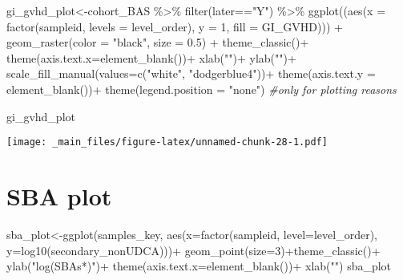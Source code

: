 \documentclass[
]{book}
\newenvironment{Shaded}{\begin{snugshade}}{\end{snugshade}}
\newcommand{\AttributeTok}[1]{\textcolor[rgb]{0.77,0.63,0.00}{#1}}
\newcommand{\CommentTok}[1]{\textcolor[rgb]{0.56,0.35,0.01}{\textit{#1}}}
\newcommand{\DecValTok}[1]{\textcolor[rgb]{0.00,0.00,0.81}{#1}}
\newcommand{\FloatTok}[1]{\textcolor[rgb]{0.00,0.00,0.81}{#1}}
\newcommand{\FunctionTok}[1]{\textcolor[rgb]{0.00,0.00,0.00}{#1}}
\newcommand{\NormalTok}[1]{#1}
\newcommand{\OtherTok}[1]{\textcolor[rgb]{0.56,0.35,0.01}{#1}}
\newcommand{\SpecialCharTok}[1]{\textcolor[rgb]{0.00,0.00,0.00}{#1}}
\newcommand{\StringTok}[1]{\textcolor[rgb]{0.31,0.60,0.02}{#1}}
\begin{document}
\begin{Shaded}
\begin{Highlighting}[]
\NormalTok{gi\_gvhd\_plot}\OtherTok{\textless{}{-}}\NormalTok{cohort\_BAS }\SpecialCharTok{\%\textgreater{}\%} 
  \FunctionTok{filter}\NormalTok{(later}\SpecialCharTok{==}\StringTok{"Y"}\NormalTok{) }\SpecialCharTok{\%\textgreater{}\%} 
  \FunctionTok{ggplot}\NormalTok{((}\FunctionTok{aes}\NormalTok{(}\AttributeTok{x =} \FunctionTok{factor}\NormalTok{(sampleid, }\AttributeTok{levels =}\NormalTok{ level\_order), }\AttributeTok{y =} \DecValTok{1}\NormalTok{, }\AttributeTok{fill =}\NormalTok{ GI\_GVHD))) }\SpecialCharTok{+} 
  \FunctionTok{geom\_raster}\NormalTok{(}\AttributeTok{color =} \StringTok{"black"}\NormalTok{, }\AttributeTok{size =} \FloatTok{0.5}\NormalTok{) }\SpecialCharTok{+}
  \FunctionTok{theme\_classic}\NormalTok{()}\SpecialCharTok{+} \FunctionTok{theme}\NormalTok{(}\AttributeTok{axis.text.x=}\FunctionTok{element\_blank}\NormalTok{())}\SpecialCharTok{+}
  \FunctionTok{xlab}\NormalTok{(}\StringTok{""}\NormalTok{)}\SpecialCharTok{+}
  \FunctionTok{ylab}\NormalTok{(}\StringTok{""}\NormalTok{)}\SpecialCharTok{+}
  \FunctionTok{scale\_fill\_manual}\NormalTok{(}\AttributeTok{values=}\FunctionTok{c}\NormalTok{(}\StringTok{"white"}\NormalTok{, }\StringTok{"dodgerblue4"}\NormalTok{))}\SpecialCharTok{+}
  \FunctionTok{theme}\NormalTok{(}\AttributeTok{axis.text.y =} \FunctionTok{element\_blank}\NormalTok{())}\SpecialCharTok{+}
  \FunctionTok{theme}\NormalTok{(}\AttributeTok{legend.position =} \StringTok{"none"}\NormalTok{) }\CommentTok{\#only for plotting reasons}
  
\NormalTok{gi\_gvhd\_plot}
\end{Highlighting}
\end{Shaded}

\texttt{[image: \_main\_files/figure-latex/unnamed-chunk-28-1.pdf]}

\hypertarget{sba-plot}{%
\section{SBA plot}\label{sba-plot}}

\begin{Shaded}
\begin{Highlighting}[]
\NormalTok{sba\_plot}\OtherTok{\textless{}{-}}\FunctionTok{ggplot}\NormalTok{(samples\_key, }\FunctionTok{aes}\NormalTok{(}\AttributeTok{x=}\FunctionTok{factor}\NormalTok{(sampleid, }\AttributeTok{level=}\NormalTok{level\_order), }\AttributeTok{y=}\FunctionTok{log10}\NormalTok{(secondary\_nonUDCA)))}\SpecialCharTok{+}
  \FunctionTok{geom\_point}\NormalTok{(}\AttributeTok{size=}\DecValTok{3}\NormalTok{)}\SpecialCharTok{+}\FunctionTok{theme\_classic}\NormalTok{()}\SpecialCharTok{+}
  \FunctionTok{ylab}\NormalTok{(}\StringTok{"log(SBAs*)"}\NormalTok{)}\SpecialCharTok{+}
  \FunctionTok{theme}\NormalTok{(}\AttributeTok{axis.text.x=}\FunctionTok{element\_blank}\NormalTok{())}\SpecialCharTok{+}
  \FunctionTok{xlab}\NormalTok{(}\StringTok{""}\NormalTok{)}
\NormalTok{sba\_plot}
\end{Highlighting}
\end{Shaded}
\end{document}
